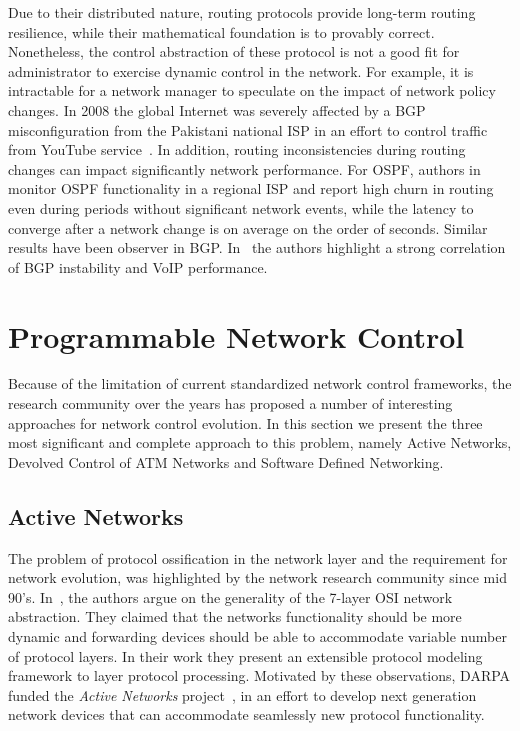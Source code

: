 Due to their distributed nature, routing protocols provide long-term routing
resilience, while their mathematical foundation is to provably correct.
Nonetheless, the control abstraction of these protocol is not a good fit for
administrator to exercise dynamic control in the network. For example, it is
intractable for a network manager to speculate on the impact of network policy
changes.  In 2008 the global Internet was severely affected by a BGP
misconfiguration from the Pakistani national ISP in an effort to control traffic
from YouTube service~\cite{bgp_config_error}.  In addition,
routing inconsistencies during routing changes can impact significantly network
performance.  For OSPF, authors in~\cite{Watson2003} monitor OSPF functionality
in a regional ISP and report high churn in routing even during periods without
significant network events, while the latency to converge after a network change
is on average on the order of seconds. Similar results have been observer in
BGP\@. In~\cite{Kushman2007} the authors highlight a strong correlation of BGP
instability and VoIP performance. 

\section{Programmable Network Control} \label{sec:background:prog_control}

Because of the limitation of current standardized network control frameworks,
the research community over the years has proposed a number of interesting
approaches for network control evolution. In this section we present the three
most significant and complete approach to this problem, namely Active Networks,
Devolved Control of ATM Networks and Software Defined Networking. 

\subsection{Active Networks}

The problem of protocol ossification in the network layer and the requirement
for network evolution, was highlighted  by the network research community since
mid 90's. In~\cite{O'Malley1992}, the authors argue on the generality of the
7-layer OSI network abstraction. They claimed that the networks functionality
should be more dynamic and forwarding devices should be able to accommodate
variable number of protocol layers. In their work they present an extensible
protocol modeling framework to layer protocol processing. Motivated by these
observations, DARPA funded the \emph{Active Networks}
project~\cite{darpa_active_net}, in an effort to develop next generation network
devices that can accommodate seamlessly new protocol functionality. 


